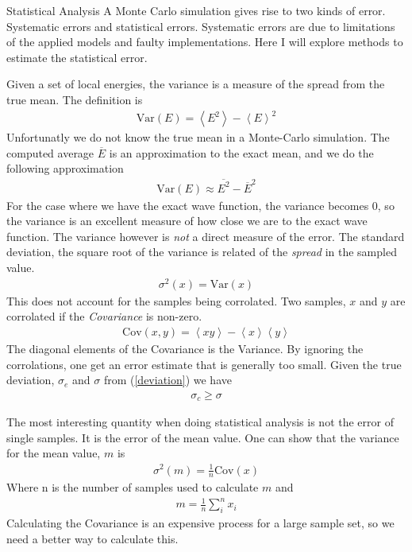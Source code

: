 \documentclass[a4paper, 12pt, titlepage]{article}
\begin{document}
\begin{section}{Statistical Analysis}
 A Monte Carlo simulation gives rise to two kinds of error. Systematic errors and statistical errors. Systematic errors are due to limitations of the applied models and faulty implementations. Here I will explore methods to estimate the statistical error. 

 Given a set of local energies, the variance is a measure of the spread from the true mean. The definition is
 \begin{align*}
 	\text{Var}(E) = \left< E^2 \right> - \left< E \right> ^2 
 \end{align*}
 Unfortunatly we do not know the true mean in a Monte-Carlo simulation. The computed average $\overline E$ is an approximation to the exact mean, and we do the following approximation
 \begin{align*}
 	\text{Var}(E) \approx \overline{E^2} - \overline{E}^2 
 \end{align*}
 For the case where we have the exact wave function, the variance becomes $0$, so the variance is an excellent measure of how close we are to the exact wave function. The variance however is \textit{not} a direct measure of the error. The standard deviation, the square root of the variance is related of the \textit{spread} in the sampled value. 
 \begin{align}
 	\sigma ^2(x) = \text{Var}(x)
 	\label{deviation}
 \end{align}
 This does not account for the samples being corrolated. Two samples, $x$ and $y$ are corrolated if the \textit{Covariance} is non-zero.
 \begin{align*}
 	\text{Cov}(x,y) = \left< xy \right> - \left< x \right> \left<y \right> 
 \end{align*}
 The diagonal elements of the Covariance is the Variance. By ignoring the corrolations, one get an error estimate that is generally too small. Given the true deviation, $\sigma_e$ and $\sigma$ from (\ref{deviation}) we have
 \begin{align*}
 	\sigma_c \geq \sigma
 \end{align*}

 The most interesting quantity when doing statistical analysis is not the error of single samples. It is the error of the mean value. One can show that the variance for the mean value, $m$ is 
 \begin{align}
 	\sigma^2 (m) = \frac{1}{n} \text{Cov}(x)
 	\label{covariance}
 \end{align}
 Where n is the number of samples used to calculate $m$ and 
 \begin{align*}
 	m = \frac{1}{n} \sum_i^n x_i
 \end{align*}
 Calculating the Covariance is an expensive process for a large sample set, so we need a better way to calculate this. 

\end{section}
\end{document}
